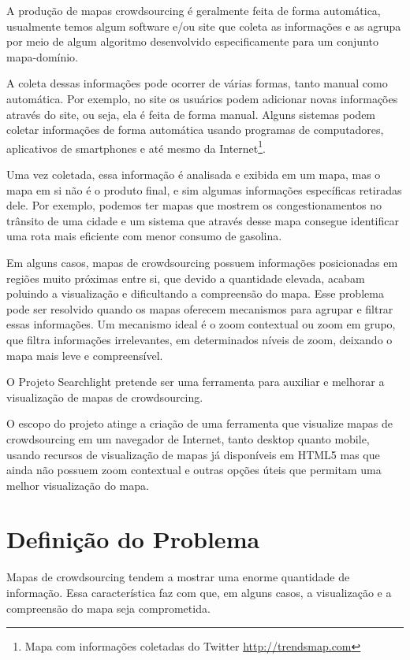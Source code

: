A produção de mapas crowdsourcing é geralmente feita de forma automática, usualmente temos algum software e/ou site que coleta as informações e as agrupa por meio de algum algoritmo desenvolvido especificamente para um conjunto mapa-domínio.

A coleta dessas informações pode ocorrer de várias formas, tanto manual como automática. Por exemplo, no site  os usuários podem adicionar novas informações através do site, ou seja, ela é feita de forma manual. Alguns sistemas podem coletar informações de forma automática usando programas de computadores, aplicativos de smartphones \cite{thiagarajan_cooperative_2010}  e até mesmo da Internet\footnote{ Mapa com informações coletadas do Twitter \url{http://trendsmap.com}}.

Uma vez coletada, essa informação é analisada e exibida em um mapa, mas o mapa em si não é o produto final, e sim algumas informações específicas retiradas dele. Por exemplo, podemos ter mapas que mostrem os congestionamentos no trânsito de uma cidade e um sistema \cite{thiagarajan_vtrack:_2009} que através desse mapa consegue identificar  uma rota mais eficiente com menor consumo de gasolina.

Em alguns casos, mapas de crowdsourcing possuem informações posicionadas em regiões muito próximas entre si, que devido a quantidade elevada, acabam poluindo a visualização e dificultando a compreensão do mapa. Esse problema pode ser resolvido quando os mapas oferecem mecanismos para agrupar e filtrar essas informações. Um mecanismo ideal é o zoom contextual ou zoom em grupo, que filtra informações irrelevantes, em determinados níveis de zoom, deixando o mapa mais leve e compreensível.

O Projeto Searchlight pretende ser uma ferramenta para auxiliar e melhorar a visualização de mapas de crowdsourcing.

O escopo do projeto atinge a criação de uma ferramenta que visualize mapas de crowdsourcing em um navegador de Internet, tanto desktop quanto mobile, usando recursos de visualização de mapas já disponíveis em HTML5 mas que ainda não possuem zoom contextual e outras opções úteis que permitam uma melhor visualização do mapa.



\section{Definição do Problema}
Mapas de crowdsourcing tendem a mostrar uma enorme quantidade de informação. Essa característica faz com que, em alguns casos, a visualização e a compreensão do mapa seja comprometida.
 
